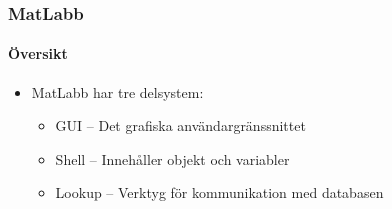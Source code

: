 \begin{frame}
  \frametitle{MatLabb}
  \framesubtitle{Översikt}
  \begin{itemize}
    \item MatLabb har tre delsystem:
      \begin{itemize}
        \item GUI -- Det grafiska användargränssnittet
        \item Shell -- Innehåller objekt och variabler
        \item Lookup -- Verktyg för kommunikation med databasen
      \end{itemize}
  \end{itemize}
\end{frame}
